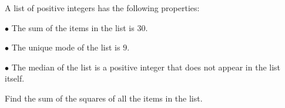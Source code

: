 A list of positive integers has the following properties:

$\bullet$ The sum of the items in the list is $30$.

$\bullet$ The unique mode of the list is $9$.

$\bullet$ The median of the list is a positive integer that does not appear in the list itself.

Find the sum of the squares of all the items in the list.
